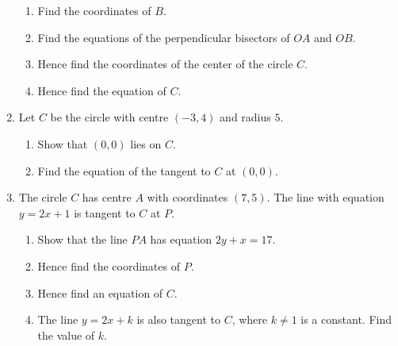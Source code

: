 \documentclass{article}
\begin{document}
\begin{enumerate}
		\begin{enumerate}
			\item Find the coordinates of $B$. %
			\item Find the equations of the perpendicular bisectors of $OA$ and $OB$. %
			\item Hence find the coordinates of the center of the circle $C$. %
			\item Hence find the equation of $C$. %
		\end{enumerate}
	\item Let $C$ be the circle with centre $(-3,4)$ and radius $5$.
		\begin{enumerate}
			\item Show that $(0,0)$ lies on $C$.
			\item Find the equation of the tangent to $C$ at $(0,0)$.
		\end{enumerate}
	\item The circle $C$ has centre $A$ with coordinates $(7,5)$. The line with equation $y=2x+1$ is tangent to $C$ at $P$.
		\begin{enumerate}
			\item Show that the line $PA$ has equation $2y+x=17$.
			\item Hence find the coordinates of $P$.
			\item Hence find an equation of $C$.
			\item The line $y=2x+k$ is also tangent to $C$, where $k\neq 1$ is a constant. Find the value of $k$.
		\end{enumerate}
\end{enumerate}
\end{document}
